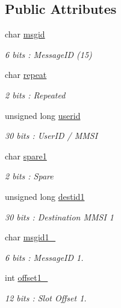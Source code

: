 \subsection*{Public Attributes}
\begin{DoxyCompactItemize}
\item 
char \mbox{\hyperlink{structaismsg__15_abb9872defabbb7604feb05b3a99c105e}{msgid}}
\begin{DoxyCompactList}\small\item\em 6 bits \+: Message\+ID (15) \end{DoxyCompactList}\item 
char \mbox{\hyperlink{structaismsg__15_aac1062cafe02a827d844dad71c827d6f}{repeat}}
\begin{DoxyCompactList}\small\item\em 2 bits \+: Repeated \end{DoxyCompactList}\item 
unsigned long \mbox{\hyperlink{structaismsg__15_a8e938c4246346c4ef8b17f707811eb54}{userid}}
\begin{DoxyCompactList}\small\item\em 30 bits \+: User\+ID / M\+M\+SI \end{DoxyCompactList}\item 
char \mbox{\hyperlink{structaismsg__15_a3a683dda3da78dbe9c189a952e44c5a5}{spare1}}
\begin{DoxyCompactList}\small\item\em 2 bits \+: Spare \end{DoxyCompactList}\item 
unsigned long \mbox{\hyperlink{structaismsg__15_a392e77958a0f98c8029ad7e7e549b934}{destid1}}
\begin{DoxyCompactList}\small\item\em 30 bits \+: Destination M\+M\+SI 1 \end{DoxyCompactList}\item 
char \mbox{\hyperlink{structaismsg__15_a09dfdda53f5e5560a75e0500fc5dff46}{msgid1\+\_}}
\begin{DoxyCompactList}\small\item\em 6 bits \+: Message\+ID 1. \end{DoxyCompactList}\item 
int \mbox{\hyperlink{structaismsg__15_a5d4840273e876125167b20914b2f72d0}{offset1\+\_}}
\begin{DoxyCompactList}\small\item\em 12 bits \+: Slot Offset 1. \end{DoxyCompactList}\item 

\end{DoxyCompactItemize}
